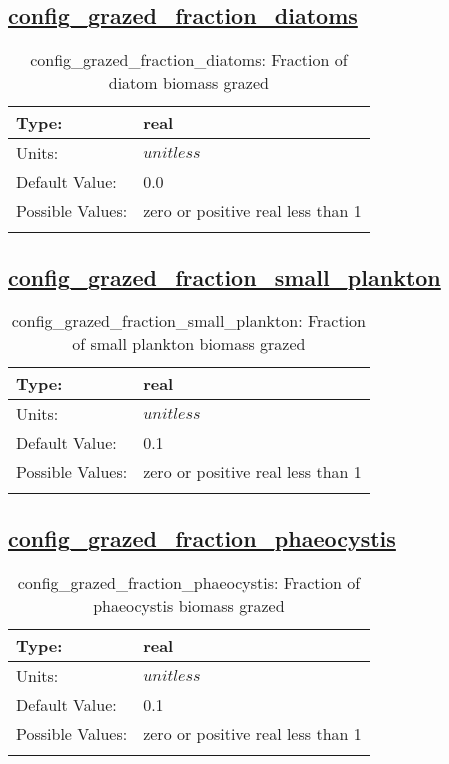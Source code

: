 \subsection[config\_grazed\_fraction\_diatoms]{\hyperref[sec:nm_tab_biogeochemistry]{config\_grazed\_fraction\_diatoms}}
\label{subsec:nm_sec_config_grazed_fraction_diatoms}
\begin{center}
\begin{longtable}{| p{2.0in} || p{4.0in} |}
    \hline
    Type: & real \\
    \hline
    Units: & $unitless$ \\
    \hline
    Default Value: & 0.0 \\
    \hline
    Possible Values: & zero or positive real less than 1 \\
    \hline
    \caption{config\_grazed\_fraction\_diatoms: Fraction of diatom biomass grazed}
\end{longtable}
\end{center}
\subsection[config\_grazed\_fraction\_small\_plankton]{\hyperref[sec:nm_tab_biogeochemistry]{config\_grazed\_fraction\_small\_plankton}}
\label{subsec:nm_sec_config_grazed_fraction_small_plankton}
\begin{center}
\begin{longtable}{| p{2.0in} || p{4.0in} |}
    \hline
    Type: & real \\
    \hline
    Units: & $unitless$ \\
    \hline
    Default Value: & 0.1 \\
    \hline
    Possible Values: & zero or positive real less than 1 \\
    \hline
    \caption{config\_grazed\_fraction\_small\_plankton: Fraction of small plankton biomass grazed}
\end{longtable}
\end{center}
\subsection[config\_grazed\_fraction\_phaeocystis]{\hyperref[sec:nm_tab_biogeochemistry]{config\_grazed\_fraction\_phaeocystis}}
\label{subsec:nm_sec_config_grazed_fraction_phaeocystis}
\begin{center}
\begin{longtable}{| p{2.0in} || p{4.0in} |}
    \hline
    Type: & real \\
    \hline
    Units: & $unitless$ \\
    \hline
    Default Value: & 0.1 \\
    \hline
    Possible Values: & zero or positive real less than 1 \\
    \hline
    \caption{config\_grazed\_fraction\_phaeocystis: Fraction of phaeocystis biomass grazed}
\end{longtable}
\end{center}
